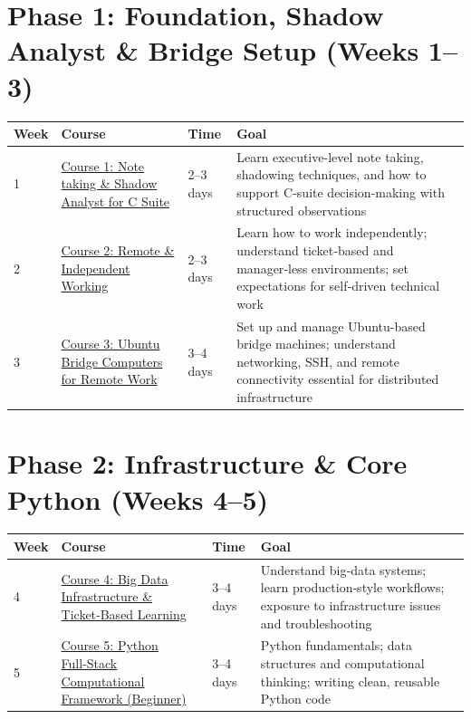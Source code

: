 \documentclass[12pt]{article}
\begin{document}
	\section*{Phase 1: Foundation, Shadow Analyst \& Bridge Setup (Weeks 1–3)}
	
	\begin{tabularx}{\textwidth}{|X|p{3cm}|p{3cm}|X|}
		\hline
		\textbf{Week} & \textbf{Course} & \textbf{Time} & \textbf{Goal} \\
		\hline
		1 & \href{https://www.udemy.com/course/note-taking-course-and-shadow-analyst-for-c-suite-analyst/}{Course 1: Note taking \& Shadow Analyst for C Suite} & 2–3 days & Learn executive-level note taking, shadowing techniques, and how to support C-suite decision-making with structured observations \\
		\hline
		2 & \href{https://www.udemy.com/course/remote-independent-working-in-a-managerless-environment-101/}{Course 2: Remote \& Independent Working} & 2–3 days & Learn how to work independently; understand ticket‑based and manager‑less environments; set expectations for self‑driven technical work \\
		\hline
		3 & \href{https://www.udemy.com/course/connecting-managing-ubuntu-bridge-computers-for-remote-work/}{Course 3: Ubuntu Bridge Computers for Remote Work} & 3–4 days & Set up and manage Ubuntu-based bridge machines; understand networking, SSH, and remote connectivity essential for distributed infrastructure \\
		\hline
	\end{tabularx}
	
	\vspace{0.3cm}
	
	\section*{Phase 2: Infrastructure \& Core Python (Weeks 4–5)}
	
	\begin{tabularx}{\textwidth}{|X|p{3cm}|p{3cm}|X|}
		\hline
		\textbf{Week} & \textbf{Course} & \textbf{Time} & \textbf{Goal} \\
		\hline
		4 & \href{https://www.udemy.com/course/big-data-infra-admin-101-ticket-based-learning/}{Course 4: Big Data Infrastructure \& Ticket‑Based Learning} & 3–4 days & Understand big‑data systems; learn production‑style workflows; exposure to infrastructure issues and troubleshooting \\
		\hline
		5 & \href{https://www.udemy.com/course/python-full-stack-computational-framework-for-begineers-101/}{Course 5: Python Full‑Stack Computational Framework (Beginner)} & 3–4 days & Python fundamentals; data structures and computational thinking; writing clean, reusable Python code \\
		\hline
	\end{tabularx}
	
\end{document}
